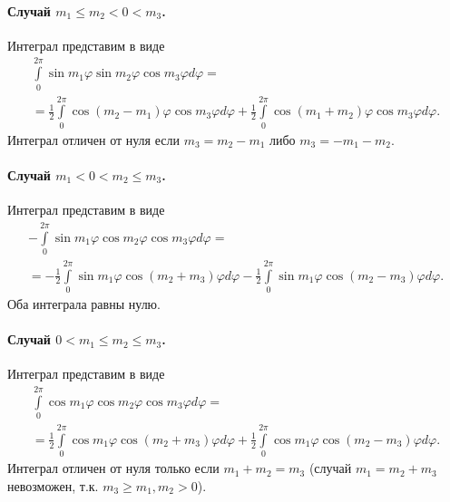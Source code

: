 \paragraph{Случай $m_1 \leq m_2 < 0 < m_3$.} Интеграл представим в виде
\begin{multline*}
\int\limits_{0}^{2\pi}
\sin m_1 \varphi
\sin m_2 \varphi
\cos m_3 \varphi
d\varphi = \\ 
= 
\frac{1}{2}\int\limits_{0}^{2\pi}
\cos (m_2 - m_1) \varphi
\cos m_3 \varphi
d\varphi 
+
\frac{1}{2}\int\limits_{0}^{2\pi}
\cos (m_1 + m_2) \varphi
\cos m_3 \varphi
d\varphi.
\end{multline*}
Интеграл отличен от нуля если $m_3 = m_2 - m_1$ либо $m_3 = -m_1 - m_2$.

\paragraph{Случай $m_1 < 0 < m_2 \leq m_3$.} Интеграл представим в виде
\begin{multline*}
-\int\limits_{0}^{2\pi}
\sin m_1 \varphi
\cos m_2 \varphi
\cos m_3 \varphi
d\varphi = \\ 
= 
-\frac{1}{2}\int\limits_{0}^{2\pi}
\sin m_1 \varphi
\cos (m_2 + m_3) \varphi
d\varphi 
-
\frac{1}{2}\int\limits_{0}^{2\pi}
\sin m_1 \varphi
\cos (m_2 - m_3) \varphi
d\varphi.
\end{multline*}
Оба интеграла равны нулю. 

\paragraph{Случай $0 < m_1 \leq m_2 \leq m_3$.} Интеграл представим в виде
\begin{multline*}
\int\limits_{0}^{2\pi}
\cos m_1 \varphi
\cos m_2 \varphi
\cos m_3 \varphi
d\varphi = \\ 
= 
\frac{1}{2}\int\limits_{0}^{2\pi}
\cos m_1 \varphi
\cos (m_2 + m_3) \varphi
d\varphi 
+
\frac{1}{2}\int\limits_{0}^{2\pi}
\cos m_1 \varphi
\cos (m_2 - m_3) \varphi
d\varphi.
\end{multline*}
Интеграл отличен от нуля только если $m_1 + m_2 = m_3$ (случай $m_1 = m_2 + m_3$ невозможен, т.к. $m_3 \geq m_1, m_2 > 0$).

